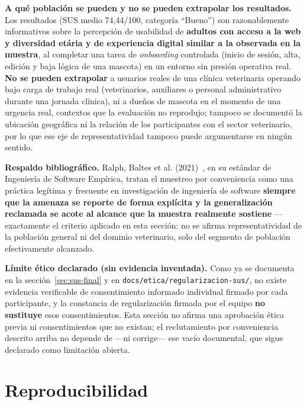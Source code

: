 \textbf{A qu\'e poblaci\'on se pueden y no se pueden extrapolar los
resultados.} Los resultados (SUS medio 74{,}44/100, categor\'ia
``Bueno'') son razonablemente informativos sobre la percepci\'on de
usabilidad de \textbf{adultos con acceso a la web y diversidad et\'aria y
de experiencia digital similar a la observada en la muestra}, al
completar una tarea de \emph{onboarding} controlada (inicio de
sesi\'on, alta, edici\'on y baja l\'ogica de una mascota) en un entorno
sin presi\'on operativa real. \textbf{No se pueden extrapolar} a
usuarios reales de una cl\'inica veterinaria operando bajo carga de
trabajo real (veterinarios, auxiliares o personal administrativo
durante una jornada cl\'inica), ni a due\~nos de mascota en el momento de
una urgencia real, contextos que la evaluaci\'on no reprodujo; tampoco se
document\'o la ubicaci\'on geogr\'afica ni la relaci\'on de los
participantes con el sector veterinario, por lo que ese eje de
representatividad tampoco puede argumentarse en ning\'un sentido.

\textbf{Respaldo bibliogr\'afico.} Ralph, Baltes et al.
(2021)~\cite{ralph2021-empirical-standards}, en su est\'andar de
Ingenier\'ia de Software Emp\'irica, tratan el muestreo por conveniencia
como una pr\'actica leg\'itima y frecuente en investigaci\'on de
ingenier\'ia de software \textbf{siempre que la amenaza se reporte de
forma expl\'icita y la generalizaci\'on reclamada se acote al alcance que
la muestra realmente sostiene} --- exactamente el criterio aplicado en
esta secci\'on: no se afirma representatividad de la poblaci\'on general
ni del dominio veterinario, solo del segmento de poblaci\'on
efectivamente alcanzado.

\textbf{L\'imite \'etico declarado (sin evidencia inventada).} Como ya
se documenta en la secci\'on~\ref{sec:sus-final} y en
\texttt{docs/etica/regularizacion-sus/}, no existe evidencia verificable
de consentimiento informado individual firmado por cada participante, y
la constancia de regularizaci\'on firmada por el equipo \textbf{no
sustituye} esos consentimientos. Esta secci\'on no afirma una aprobaci\'on
\'etica previa ni consentimientos que no existan; el reclutamiento por
conveniencia descrito arriba no depende de ---ni corrige--- ese vac\'io
documental, que sigue declarado como limitaci\'on abierta.

\section{Reproducibilidad}

